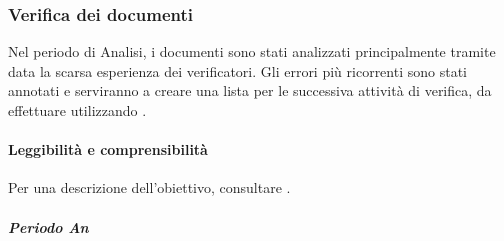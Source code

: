 				\subsubsection{Verifica dei documenti}
					Nel periodo di Analisi, i documenti sono stati analizzati principalmente tramite  data la scarsa esperienza dei verificatori. Gli errori più ricorrenti sono stati annotati e serviranno a creare una lista per le successiva attività di verifica, da effettuare utilizzando .		

					\paragraph{Leggibilità e comprensibilità}
						Per una descrizione dell'obiettivo, consultare .
						\subparagraph{Periodo An}
